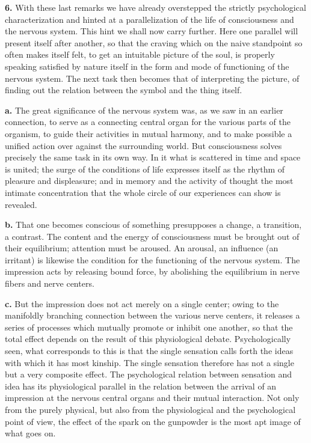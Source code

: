 \documentclass[12pt,a4paper]{book}
\newcommand{\opage}[1]{\marginnote{\footnotesize\textit{[#1]}}}
\begin{document}
\opage{61}\textbf{6.} With these last remarks we have already overstepped
the strictly psychological characterization and hinted at a
parallelization of the life of consciousness and the nervous system.
This hint we shall now carry further. Here one parallel will present
itself after another, so that the craving which on the naive standpoint
so often makes itself felt, to get an intuitable picture of the soul, is
properly speaking satisfied by nature itself in the form and mode of
functioning of the nervous system. The next task then becomes that of
interpreting the picture, of finding out the relation between the
symbol and the thing itself.

\textbf{a.} The great significance of the nervous system was, as we saw
in an earlier connection, to serve as a connecting central organ for the
various parts of the organism, to guide their activities in mutual
harmony, and to make possible a unified action over against the
surrounding world. But consciousness solves precisely the same task in
its own way. In it what is scattered in time and space is united; the
surge of the conditions of life expresses itself as the rhythm of
pleasure and displeasure; and in memory and the activity of thought the
most intimate concentration that the whole circle of our experiences
can show is revealed.

\textbf{b.} That one becomes conscious of something presupposes a
change, a transition, a contrast. The content and the energy of
consciousness must be brought out of their equilibrium; attention must
be aroused. An arousal, an influence (an irritant) is likewise the
condition for the functioning of the nervous system. The impression acts
by releasing bound force, by abolishing the equilibrium in nerve fibers
and nerve centers.

\textbf{c.} But the impression does not act merely on a single center;
owing to the manifoldly branching connection between the various nerve
centers, it releases a series of processes which mutually promote or
inhibit one another, so that the total effect depends on the result of
this physiological debate. Psychologically seen, what corresponds to
this is that the single sensation calls forth the ideas with which it
has most kinship. The single sensation therefore has not a single but a
very composite effect. The psychological relation between sensation and
idea has its physiological parallel in the relation between the arrival
of an impression at the nervous central organs and their mutual
interaction. Not only from the
\opage{62}purely physical, but also from the physiological and the
psychological point of view, the effect of the spark on the gunpowder is
the most apt image of what goes on.
\end{document}
